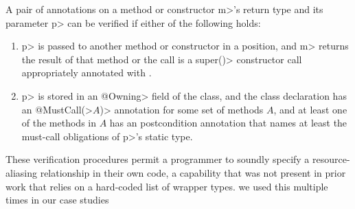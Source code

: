A pair of \MustCallAlias annotations on a method or constructor \<m>'s return type
and its parameter \<p> can be verified if either of the following holds:
\begin{enumerate}
\item \<p> is passed to another method or constructor in a
  \MustCallAlias position, and \<m> returns the result of that method
  or the call is a \<super()> constructor call appropriately annotated
  with \MustCallAlias.
\item \<p> is stored in an \<@Owning> field of the class, and the
  class declaration has an \<@MustCall(>$A$\<)> annotation for some set
  of methods $A$, and at least one of the methods in $A$ has an
  \EnsuresCalledMethods postcondition annotation that names at least the
  must-call obligations of \<p>'s static type.
\end{enumerate}
These verification procedures permit a programmer to soundly specify a resource-aliasing
relationship in their own code, a capability that was not present in prior work
that relies on a hard-coded list of wrapper types.  we used this
multiple times
in our case studies



